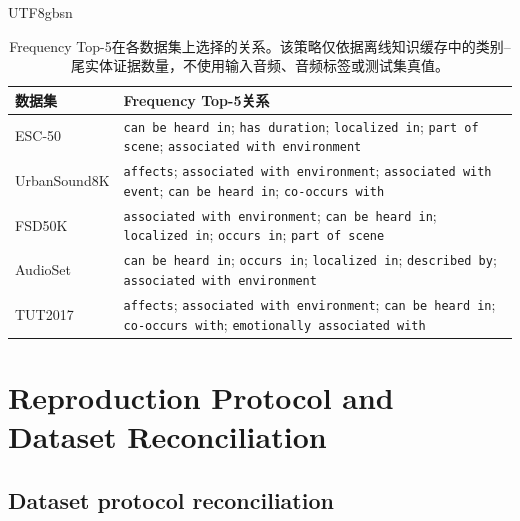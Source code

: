 \begin{CJK*}{UTF8}{gbsn}
\begin{table}[t]
\centering
\caption{Frequency Top-5在各数据集上选择的关系。该策略仅依据离线知识缓存中的类别--尾实体证据数量，不使用输入音频、音频标签或测试集真值。}
\label{tab:frequency-relations}
\setlength{\tabcolsep}{4pt}
\begin{tabular}{lp{}}
\toprule
数据集 & Frequency Top-5关系 \\
\midrule
ESC-50 & \texttt{can be heard in}; \texttt{has duration}; \texttt{localized in}; \texttt{part of scene}; \texttt{associated with environment} \\
UrbanSound8K & \texttt{affects}; \texttt{associated with environment}; \texttt{associated with event}; \texttt{can be heard in}; \texttt{co-occurs with} \\
FSD50K & \texttt{associated with environment}; \texttt{can be heard in}; \texttt{localized in}; \texttt{occurs in}; \texttt{part of scene} \\
AudioSet & \texttt{can be heard in}; \texttt{occurs in}; \texttt{localized in}; \texttt{described by}; \texttt{associated with environment} \\
TUT2017 & \texttt{affects}; \texttt{associated with environment}; \texttt{can be heard in}; \texttt{co-occurs with}; \texttt{emotionally associated with} \\
\bottomrule
\end{tabular}
\end{table}

\end{CJK*}

\onecolumn
\raggedbottom
\section{Reproduction Protocol and Dataset Reconciliation}\label{app:reproduction}
\enlargethispage{5\baselineskip}
\setcounter{table}{0}
\renewcommand{\thetable}{B.\arabic{table}}

\subsection{Dataset protocol reconciliation}

